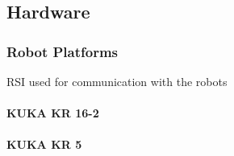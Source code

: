 \chapter{}
\label{sec:methods}
\section{Hardware }

\subsection{Robot Platforms}
RSI used for communication with the robots
\subsubsection{KUKA KR 16-2}


\subsubsection{KUKA KR 5}





